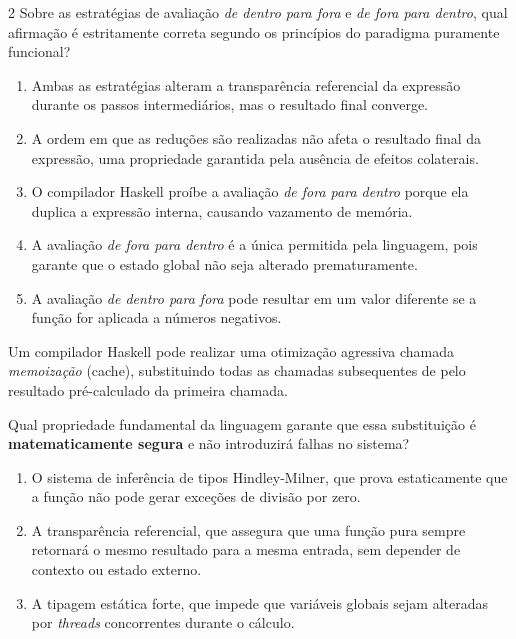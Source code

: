 \documentclass[a4paper,10pt,brazil]{article}
\begin{document}
\begin{multicols}{2}
Sobre as estratégias de avaliação \emph{de dentro para fora} e \emph{de fora para dentro}, qual afirmação é estritamente correta segundo os princípios do paradigma puramente funcional?

\begin{enumerate}
  \item Ambas as estratégias alteram a transparência referencial da expressão durante os passos intermediários, mas o resultado final converge.

  \item A ordem em que as reduções são realizadas não afeta o resultado final da expressão, uma propriedade garantida pela ausência de efeitos colaterais.

  \item O compilador Haskell proíbe a avaliação \emph{de fora para dentro} porque ela duplica a expressão interna, causando vazamento de memória.

  \item A avaliação \emph{de fora para dentro} é a única permitida pela linguagem, pois garante que o estado global não seja alterado prematuramente.

  \item A avaliação \emph{de dentro para fora} pode resultar em um valor diferente se a função  for aplicada a números negativos.


\end{enumerate}

Um compilador Haskell pode realizar uma otimização agressiva chamada \emph{memoização} (cache), substituindo todas as chamadas subsequentes de  pelo resultado pré-calculado da primeira chamada. 

Qual propriedade fundamental da linguagem garante que essa substituição é \textbf{matematicamente segura} e não introduzirá falhas no sistema?

\begin{enumerate}
  \item O sistema de inferência de tipos Hindley-Milner, que prova estaticamente que a função não pode gerar exceções de divisão por zero.

  \item A transparência referencial, que assegura que uma função pura sempre retornará o mesmo resultado para a mesma entrada, sem depender de contexto ou estado externo.

  \item A tipagem estática forte, que impede que variáveis globais sejam alteradas por \textit{threads} concorrentes durante o cálculo.


\end{enumerate}
\end{multicols}
\end{document}
